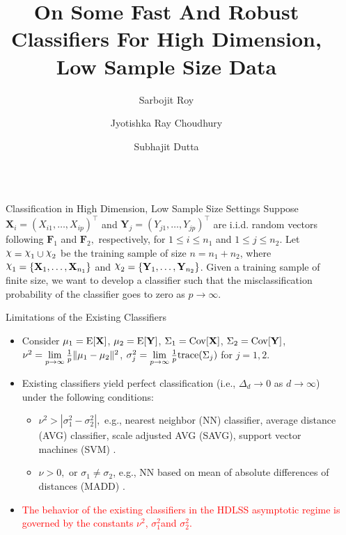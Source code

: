 \documentclass[aspectratio=169, 14pt]{beamer}
\title[Beamer Poster]{On Some Fast And Robust Classifiers For High Dimension, Low Sample Size Data}
\author{Sarbojit Roy \inst{1} \and Jyotishka Ray Choudhury \inst{2} \and Subhajit Dutta \inst{1}}
\institute[shortinst]{\inst{1} Indian Institute of Technology Kanpur \samelineand \inst{2} Indian Statistical Institute Kolkata}
\newlength{\sepwidth}
\newlength{\colwidth}
\newcommand{\separatorcolumn}{\begin{column}{\sepwidth}\end{column}}
\newcommand{\bX}{\mathbf{X}}
\newcommand{\bY}{\mathbf{Y}}
\newcommand{\bF}{\mathbf{F}}
\newcommand{\0}{\mathbf{0}}
\newcommand{\1}{\mathbf{1}}
\DeclareRobustCommand{\rchi}{{\mathpalette\irchi\relax}}
\newcommand{\irchi}[2]{\raisebox{\depth}{$#1\chi$}} %
\begin{document}
\begin{frame}[t]
\begin{columns}[t]
\separatorcolumn

\begin{column}{\colwidth}

\begin{block}{Classification in High Dimension, Low Sample Size Settings}
Suppose $\bX_i=(X_{i1},\ldots, X_{ip})^\top$ and $\bY_j=(Y_{j1},\ldots, Y_{jp})^\top$ are i.i.d. random vectors following $\bF_1$ and $\bF_2,$ respectively, for $1\le i\le n_1$ and $ 1\le j\le n_2.$ Let $\rchi = \rchi_1\cup \rchi_2$ be the training sample of size $n=n_1+n_2$, where $\rchi_1=\{\bX_{1},\ldots,\bX_{n_1}\}$ and
$\rchi_2=\{\bY_{1},\ldots,\bY_{n_2}\}$. Given a training sample of finite size, we want to develop a classifier such that the misclassification probability of the classifier goes to zero as $p\to\infty$.
\end{block}
\begin{block}{Limitations of the Existing Classifiers}
 \begin{itemize}
 \item Consider ${\bf\mu}_1={\rm E}[\bX]$, ${\bf\mu}_2={\rm E}[\bY]$,
$ \Sigma_1= {\rm Cov}[\bX]$,  $\Sigma_2={\rm Cov}[\bY]$,
$\nu^2=\lim\limits_{p\to\infty}\frac{1}{p}\|{\bf\mu}_1-{\bf\mu}_2\|^2$, $\sigma^2_j = \lim\limits_{p\to\infty}\frac{1}{p} {\rm trace} (\Sigma_j)$ for $j=1,2$. %
 \item Existing classifiers yield perfect classification (i.e., $\Delta_d \to 0$ as $d\to\infty$) under the following conditions:
 \begin{itemize}
 \item $\nu^2>|\sigma^2_1-\sigma^2_2|,$ e.g., nearest neighbor (NN) classifier, average distance (AVG) classifier, scale adjusted AVG (SAVG),  support vector machines (SVM) \citep{HMN05}.
 \item $\nu>0,$ or $\sigma_1\neq \sigma_2$, e.g.,  NN based on mean of absolute differences of distances (MADD) \citep{CH2009,PMG2016}.
 \end{itemize}
 \item \textcolor{red}{The behavior of the existing classifiers in the HDLSS asymptotic regime is governed by the constants $\nu^2$, $\sigma^2_1$and $\sigma^2_2$.}

\end{itemize}
\end{block}
\end{column}
\end{columns}
\end{frame}
\end{document}
